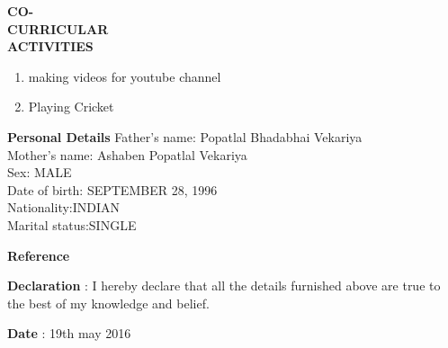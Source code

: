 \documentclass{article}
\begin{document}
  \begin{flushleft} 
  	\vspace{0.4in}
  	\textbf{CO- \\CURRICULAR \\ACTIVITIES }
  	\begin{enumerate}
  		\vspace{-0.65in}
  		\addtolength{\itemindent}{1.359in}
  		\item  making videos for youtube channel 
  		\item  Playing Cricket
  		
  	\end{enumerate}
  \end{flushleft}
  

\begin{flushleft}
	\vspace{0.4in}
	\textbf{Personal Details} \hspace{0.36in}Father's name: \hspace{0.13in} Popatlal Bhadabhai Vekariya  \\
	\hspace{1.55in}Mother's name: \hspace{0.08in} Ashaben Popatlal Vekariya \\
	\hspace{1.55in}Sex:\hspace{0.85in} MALE\\
	\hspace{1.55in}Date of birth:\hspace{0.255in} SEPTEMBER 28, 1996	\\
	\hspace{1.55in}Nationality:\hspace{0.45in}INDIAN\\
	\hspace{1.55in}Marital status:\hspace{0.28in}SINGLE
	
\end{flushleft}     


\begin{flushleft}
	\vspace{0.4in}
	\textbf{Reference} \hspace{0.75in} 
\end{flushleft}

\begin{flushleft}
	\vspace{0.2in}
	\textbf{Declaration} \hspace{0.60in} : I hereby declare that all the details furnished above are true to the best of
	my knowledge and belief.
\end{flushleft}

\begin{flushleft}
	\vspace{0.2in}
	\textbf{Date} : 19th may 2016
\end{flushleft}
\end{document}
